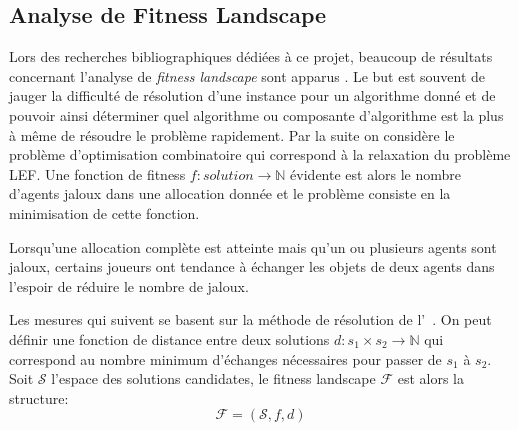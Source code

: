 \documentclass[../main.tex]{subfiles}
\begin{document}
	\subsection{Analyse de Fitness Landscape}
	Lors des recherches bibliographiques dédiées à ce projet, beaucoup de résultats concernant l'analyse de \textit{fitness landscape} sont apparus \cite{?, ?}. Le but est souvent de jauger la difficulté de résolution d'une instance pour un algorithme donné et de pouvoir ainsi déterminer quel algorithme ou composante d'algorithme est la plus à même de résoudre le problème rapidement. Par la suite on considère le problème d'optimisation combinatoire qui correspond à la relaxation du problème \textsc{LEF}. Une fonction de fitness $f : solution \rightarrow \mathbb{N}$ évidente est alors le nombre d'agents jaloux dans une allocation donnée et le problème consiste en la minimisation de cette fonction. 
	
	\begin{observation}
	\label{obs-swap}
	Lorsqu'une allocation complète est atteinte mais qu'un ou plusieurs agents sont jaloux, certains joueurs ont tendance à échanger les objets de deux agents dans l'espoir de réduire le nombre de jaloux.
	\end{observation}
	
	Les mesures qui suivent se basent sur la méthode de résolution de l'~. On peut définir une fonction de distance entre deux solutions $d : s_1 \times s_2 \rightarrow \mathbb{N}$ qui correspond au nombre minimum d'échanges nécessaires pour passer de $s_1$ à $s_2$. Soit $\mathcal{S}$ l'espace des solutions candidates, le fitness landscape $\mathcal{F}$ est alors la structure:
	\begin{equation*}
	    \mathcal{F} = (\mathcal{S}, f, d)
	\end{equation*}
	
\end{document}
